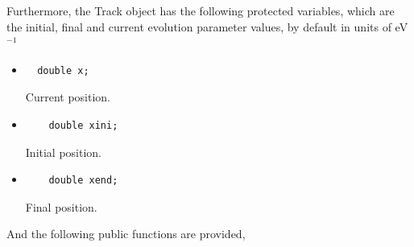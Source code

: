 \documentclass[3p,12pt]{elsarticle}
\newcommand{\ttf}{\ttfamily}
\begin{document}
Furthermore, the {\ttf Track} object has the following protected
variables, which are the initial, final and current
evolution parameter values, by default in units of eV$^{-1}$
%
%
\begin{itemize}
\item  
  \begin{lstlisting}
  double x;
  \end{lstlisting}
  Current position.
\item  
  \begin{lstlisting}
    double xini;
  \end{lstlisting}
  Initial position.
\item  
  \begin{lstlisting}
    double xend;
  \end{lstlisting}
  Final position.
\end{itemize}
%
And the following public functions are provided,
%
\end{document}
